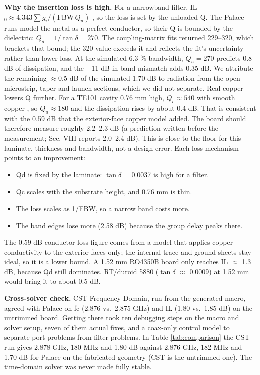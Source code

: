 \documentclass{ieeeaccess}
\begin{document}
\textbf{Why the insertion loss is high.} For a narrowband filter,
IL\(_0 \approx 4.343\sum g_i/(\text{FBW}\,Q_u)\) \cite{hong2001microstrip}, so the
loss is set by the unloaded Q. The Palace runs model the metal as a perfect
conductor, so their Q is bounded by the dielectric:
\(Q_d = 1/\tan\delta = 270\). The coupling-matrix fits returned 229--320, which
brackets that bound; the 320 value exceeds it and reflects the fit's
uncertainty rather than lower loss. At the simulated 6.3 \% bandwidth,
\(Q_u = 270\) predicts 0.8 dB of dissipation, and the \ensuremath{-}11 dB in-band mismatch
adds 0.35 dB. We attribute the remaining \ensuremath{\approx}0.5 dB of the simulated 1.70 dB to
radiation from the open microstrip, taper and launch sections, which we did
not separate. Real copper lowers Q further. For a TE101 cavity 0.76 mm high,
\(Q_c \approx 540\) with smooth copper \cite{pozar2012microwave}, so
\(Q_u \approx 180\) and the dissipation rises by about 0.4 dB. That is
consistent with the 0.59 dB that the exterior-face copper model added. The
board should therefore measure roughly 2.2--2.3 dB (a prediction written before
the measurement; Sec. VIII reports 2.0--2.4 dB). This is close to the floor for
this laminate, thickness and bandwidth, not a design error. Each loss
mechanism points to an improvement:

\begin{itemize}
\item
  Qd is fixed by the laminate: \(\tan\delta\) = 0.0037 is high for a filter.
\item
  Qc scales with the substrate height, and 0.76 mm is thin.
\item
  The loss scales as 1/FBW, so a narrow band costs more.
\item
  The band edges lose more (2.58 dB) because the group delay peaks there.
\end{itemize}

The 0.59 dB conductor-loss figure comes from a model that applies copper
conductivity to the exterior faces only; the internal trace and ground sheets
stay ideal, so it is a lower bound. A 1.52 mm RO4350B
board only reaches IL \(\approx\) 1.3 dB, because Qd still dominates. RT/duroid 5880
(\(\tan\delta\) \(\approx\) 0.0009) at 1.52 mm would bring it to about 0.5 dB.

\textbf{Cross-solver check.} CST Frequency Domain, run from the generated macro,
agreed with Palace on fc (2.876 vs.~2.875 GHz) and IL (1.80 vs.~1.85 dB) on the
untrimmed board.
Getting there took ten debugging steps on the macro and solver setup, seven
of them actual fixes, and a coax-only
control model to separate port problems from filter problems. In Table \ref{tab:comparison} the CST run gives
2.878 GHz, 180 MHz and 1.80 dB against 2.876 GHz, 182 MHz and 1.70 dB for Palace
on the fabricated geometry (CST is the untrimmed one). The time-domain solver
was never made fully stable.
\end{document}
